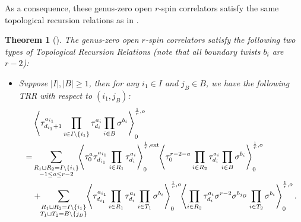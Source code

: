 \documentclass[11pt]{amsart}
\newtheorem{thm}[dummy]{Theorem}
\theoremstyle{definition}
\theoremstyle{remark}
\newcommand{\<}{\left<}
\renewcommand{\>}{\right>}
\numberwithin{equation}{section}
\begin{document}
    As a consequence, these genus-zero open $r$-spin correlators satisfy the same topological recursion relations as in \cite{BCT2}.
    
    \begin{thm}[{\cite[Theorem 4.1]{BCT2}}]\label{thm TRR BCT}
    The genus-zero open $r$-spin correlators satisfy the following two types of Topological Recursion Relations (note that all boundary twists $b_i$ are $r-2$):
\begin{itemize}
\item[(a)] Suppose $\lvert I \rvert, \lvert B \rvert\ge 1$, then for any $i_1\in I$ and $j_B\in B$, we have the following TRR with respect to $(i_1,j_B)$:
\begin{equation}\label{eq: bct trr 1}
\begin{split}
&\left\langle \tau_{d_{i_1}+1}^{a_{i_1}}\prod_{i\in I\setminus \{i_1\}}\tau^{a_i}_{d_i}\prod_{i\in B}\sigma^{b_i}\right\rangle^{\frac{1}{r},o}_0\hspace{-0.2cm}\\
=&\sum_{\substack{R_1 \sqcup R_2 = I \setminus \{{i_1}\}\\ -1\le a \le r-2}}\hspace{-0.1cm}\left\langle \tau_0^{a}\tau_{d_{i_1}}^{a_{i_1}}\prod_{i \in R_1}\tau_{d_i}^{a_i}\right\rangle^{\frac{1}{r},\text{ext}}_0
\hspace{-0.1cm}\left\langle \tau_0^{r-2-a}\prod_{i\in R_2}\tau^{a_i}_{d_i}\prod_
{i\in B}\sigma^{b_i}\right\rangle^{\frac{1}{r},o}_0\\
&+\hspace{-0.1cm}\sum_{\substack{R_1 \sqcup R_2 =  I \setminus \{{i_1}\} \\ T_1 \sqcup T_2 = B\setminus \{j_B\}}} \hspace{-0.1cm} \left\langle \tau^{a_{i_1}}_{d_{i_1}}\prod_{i \in R_1} \tau^{a_i}_{d_i}\prod_{i\in T_1}\sigma^{b_i}\right\rangle^{\frac{1}{r},o}_0 \hspace{-0.1cm}\left\langle \prod_{i \in R_2} \tau^{a_i}_{d_i} \sigma^{r-2}\sigma^{b_{j_B}}\prod_{i\in T_2}\sigma^{b_i}\right\rangle^{\frac{1}{r}, o}_0.
    \end{split}
\end{equation}


\end{itemize}
\end{thm}
\end{document}
